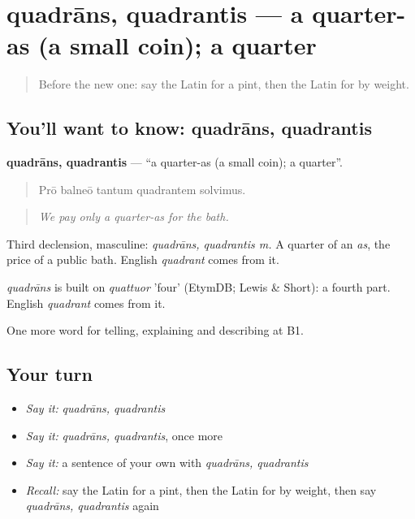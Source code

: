 \section[quadrāns, quadrantis]{quadrāns, quadrantis — a quarter-as (a small coin); a quarter}

\label{lesson:LA-C465-quadrans}



\begin{quote}
Before the new one: say the Latin for a pint, then the Latin for by weight.
\end{quote}

\subsection*{You'll want to know: quadrāns, quadrantis}
\textbf{quadrāns, quadrantis} — \textquotedblleft{}a quarter-as (a small coin); a quarter\textquotedblright{}.

\begin{quote}
Prō balneō tantum quadrantem solvimus.
\end{quote}

\begin{quote}
\emph{We pay only a quarter-as for the bath.}
\end{quote}

Third declension, masculine: \emph{quadrāns, quadrantis m.} A quarter of an \emph{as}, the price of a public bath. English \emph{quadrant} comes from it.

\begin{cousinweb}
\emph{quadrāns} is built on \emph{quattuor} 'four' (EtymDB; Lewis \& Short): a fourth part. English \emph{quadrant} comes from it.
\end{cousinweb}

\begin{grammarlens}[title={What you've built}]
One more word for telling, explaining and describing at B1.
\end{grammarlens}

\subsection*{Your turn}
\begin{itemize}
\raggedright
  \item \emph{Say it:} \emph{quadrāns, quadrantis}
  \item \emph{Say it:} \emph{quadrāns, quadrantis}, once more
  \item \emph{Say it:} a sentence of your own with \emph{quadrāns, quadrantis}
  \item \emph{Recall:} say the Latin for a pint, then the Latin for by weight, then say \emph{quadrāns, quadrantis} again
\end{itemize}


